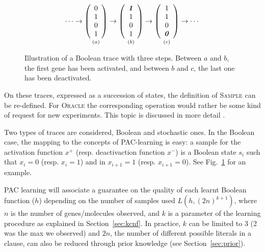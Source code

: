 \documentclass{llncs}
\newif\ifcomments%
\newcommand{\sylvain}[1]{\ifcomments\textcolor{green}{#1}\fi}
\begin{document}
\begin{figure}[htbp]
   {\large 
      \[
         \cdots
         \rightarrow
         \underset{\vspace{1em}(a)}{
            \left(\begin{array}{c}
                  0\\ 1\\ 0\\ 1
         \end{array}\right)}
         \rightarrow
         \underset{\vspace{1em}(b)}{
            \left(\begin{array}{c}
                  \textbf{\textit{1}}\\ 1\\ 0\\ 1
         \end{array}\right)}
         \rightarrow
         \underset{\vspace{1em}(c)}{
            \left(\begin{array}{c}
                  1\\ 1\\ 0\\ \textbf{\textit 0}
         \end{array}\right)}
         \rightarrow
         \cdots
      \]
   }
   \caption{Illustration of a Boolean trace with three steps. Between $a$ and
   $b$, the first gene has been activated, and between $b$ and $c$, the last
   one has been deactivated.}\label{steps}
\end{figure}

On these traces, expressed as a succession of states, the definition of
\textsc{Sample} can be re-defined. For \textsc{Oracle} the corresponding
operation would rather be some kind of request for new experiments. This topic
is discussed in more detail \sylvain{somewhere?}.

Two types of traces are considered, Boolean and stochastic ones. In the
Boolean case, the mapping to the concepts of PAC-learning is easy: a sample
for the activation function $x^+$ (resp. deactivaction function $x^-$) is a
Boolean state $s_i$ such that $x_i=0$ (resp. $x_i=1$) and in $x_{i+1}=1$
(resp. $x_{i+1}=0$). See Fig.~\ref{steps} for an example.

PAC learning will associate a guarantee on the quality of each learnt Boolean
function ($h$) depending on the number of samples used $L(h, (2n)^{k+1})$,
where $n$ is the number of genes/molecules observed, and $k$ is a parameter of
the learning procedure as explained in Section~\ref{sec:kcnf}.
In practice, $k$ can be limited to 3 (2 was the max we observed) and $2n$, the
number of different possible literals in a clause, can also be reduced through
prior knowledge (see Section~\ref{sec:prior}).
\end{document}
